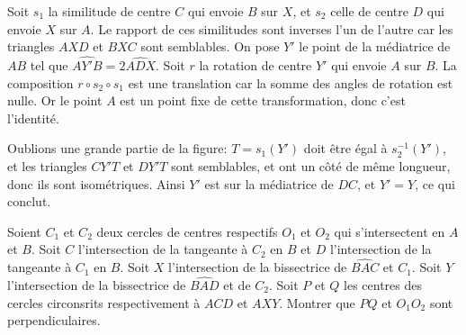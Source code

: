 \begin{sol}
\begin{center}
\end{center}

Soit $s_1$ la similitude de centre $C$ qui envoie $B$ sur $X$, et $s_2$ celle de centre $D$ qui envoie $X$ sur $A$. Le rapport de ces similitudes sont inverses l'un de l'autre car les triangles $AXD$ et $BXC$ sont semblables. On pose $Y'$ le point de la médiatrice de $AB$ tel que $\widehat{AY'B} = 2\widehat{ADX}$. Soit $r$ la rotation de centre $Y'$ qui envoie $A$ sur $B$. La composition $r\circ s_2\circ s_1$ est une translation car la somme des angles de rotation est nulle. Or le point $A$ est un point fixe de cette transformation, donc c'est l'identité.

\medskip

Oublions une grande partie de la figure: $T=s_1(Y')$ doit être égal à $s_2^{-1}(Y')$, et les triangles $CY'T$ et $DY'T$ sont semblables, et ont un côté de même longueur, donc ils sont isométriques. Ainsi $Y'$ est sur la médiatrice de $DC$, et $Y'=Y$, ce qui conclut.

\end{sol}

\begin{exo}
Soient $C_1$ et $C_2$ deux cercles de centres respectifs $O_1$ et $O_2$ qui s'intersectent en $A$ et $B$. Soit $C$ l'intersection de la tangeante à $C_2$ en $B$ et $D$ l'intersection de la tangeante à $C_1$ en $B$. Soit $X$ l'intersection de la bissectrice de $\widehat{BAC}$ et $C_1$. Soit $Y$ l'intersection de la bissectrice de $\widehat{BAD}$ et de $C_2$. Soit $P$ et $Q$ les centres des cercles circonsrits respectivement à $ACD$ et $AXY$. Montrer que $PQ$ et $O_1O_2$ sont perpendiculaires.
\end{exo}

